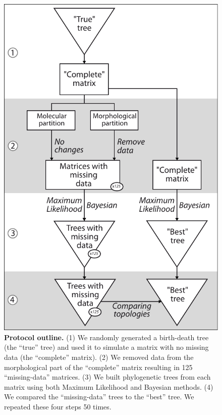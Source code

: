 \begin{figure}[!htbp]
\centering
    \includegraphics[width=1\textwidth]{TEM/Figures/Fig1.pdf}
\caption[Protocol outline]{\textbf{Protocol outline.}
(1) We randomly generated a birth-death tree (the ``true'' tree) and used it to simulate a matrix with no missing data (the ``complete'' matrix).
(2) We removed data from the morphological part of the ``complete'' matrix resulting in 125 ``missing-data'' matrices.
(3) We built phylogenetic trees from each matrix using both Maximum Likelihood and Bayesian methods.
(4) We compared the ``missing-data'' trees to the ``best'' tree.
We repeated these four steps 50 times.}
\label{Fig_Outline}
\end{figure}


